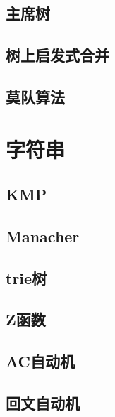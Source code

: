 \documentclass[10pt,a4paper]{article}
\begin{document}
\subsection{主席树}
\begin{spacing}{1.5}

\end{spacing}

\subsection{树上启发式合并}

\subsection{莫队算法}
\begin{spacing}{1.5}

\end{spacing}

\section{字符串}
\subsection{KMP}

\subsection{Manacher}

\subsection{trie树}

\subsection{Z函数}
\begin{spacing}{1.5}

\end{spacing}

\subsection{AC自动机}
\begin{spacing}{1.5}

\end{spacing}

\subsection{回文自动机}
\begin{spacing}{1.5}

\end{spacing}

\end{document}
